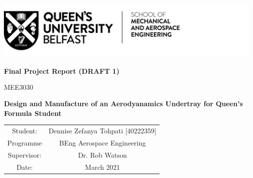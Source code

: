 \begin{titlepage}
\includegraphics[scale=1]{Figures/QUB LOGO - SMAE.png}
\centering

\vspace{4cm}
\textbf{Final Project Report (DRAFT 1)}

MEE3030

\vspace{3cm}
\textbf{Design and Manufacture of an Aerodyanamics Undertray for Queen's Formula Student}


\vspace{7cm}
\begin{tabular}{cc}
    Student: &  \quad Dennise Zefanya Tohpati [40222359]\\
    Programme & \quad BEng Aerospace Engineering\\
    Supervisor: & \quad Dr. Rob Watson\\
    Date: & \quad 16 March 2021
    
    
\end{tabular}
\newpage
\end{titlepage}
